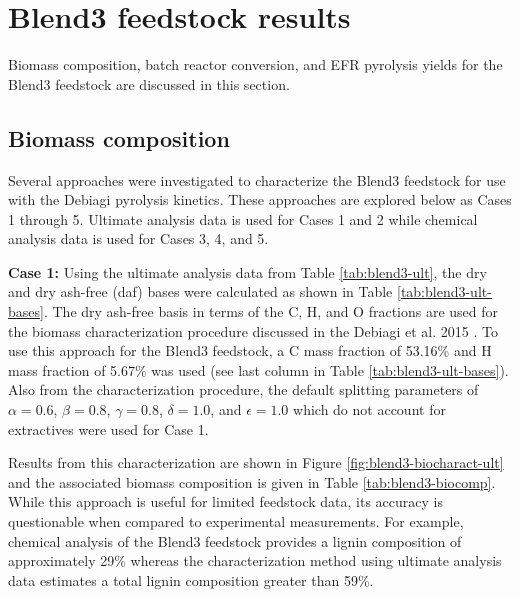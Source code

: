 
\section{Blend3 feedstock results}

Biomass composition, batch reactor conversion, and EFR pyrolysis yields for the Blend3 feedstock are discussed in this section.

\subsection{Biomass composition}

Several approaches were investigated to characterize the Blend3 feedstock for use with the Debiagi pyrolysis kinetics. These approaches are explored below as Cases 1 through 5. Ultimate analysis data is used for Cases 1 and 2 while chemical analysis data is used for Cases 3, 4, and 5.

\textbf{Case 1:} Using the ultimate analysis data from Table \ref{tab:blend3-ult}, the dry and dry ash-free (daf) bases were calculated as shown in Table \ref{tab:blend3-ult-bases}. The dry ash-free basis in terms of the C, H, and O fractions are used for the biomass characterization procedure discussed in the Debiagi et al. 2015 \cite{Debiagi-2015}. To use this approach for the Blend3 feedstock, a C mass fraction of 53.16\% and H mass fraction of 5.67\% was used (see last column in Table \ref{tab:blend3-ult-bases}). Also from the characterization procedure, the default splitting parameters of $\alpha = 0.6$, $\beta = 0.8$, $\gamma = 0.8$, $\delta = 1.0$, and $\epsilon = 1.0$ which do not account for extractives were used for Case 1.

Results from this characterization are shown in Figure \ref{fig:blend3-biocharact-ult} and the associated biomass composition is given in Table \ref{tab:blend3-biocomp}. While this approach is useful for limited feedstock data, its accuracy is questionable when compared to experimental measurements. For example, chemical analysis of the Blend3 feedstock provides a lignin composition of approximately 29\% whereas the characterization method using ultimate analysis data estimates a total lignin composition greater than 59\%.

